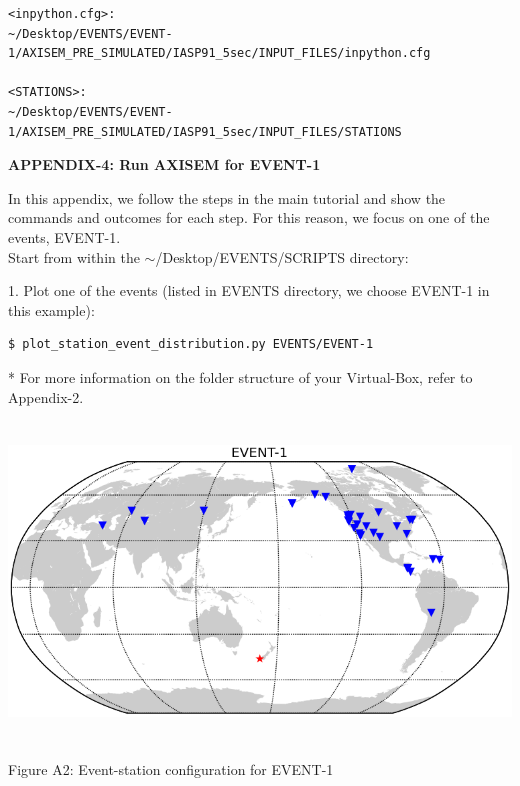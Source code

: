 \documentclass{article}
\begin{document}
\begin{lstlisting}
<inpython.cfg>: 
~/Desktop/EVENTS/EVENT-1/AXISEM_PRE_SIMULATED/IASP91_5sec/INPUT_FILES/inpython.cfg

<STATIONS>:
~/Desktop/EVENTS/EVENT-1/AXISEM_PRE_SIMULATED/IASP91_5sec/INPUT_FILES/STATIONS
\end{lstlisting}

\newpage

{\large{}\textbf{APPENDIX-4: Run AXISEM for EVENT-1}}

In this appendix, we follow the steps in the main tutorial and show the commands 
and outcomes for each step. For this reason, we focus on one of the events, EVENT-1. \\

Start from within the $\sim$/Desktop/EVENTS/SCRIPTS directory:

1. Plot one of the events (listed in EVENTS directory, we choose EVENT-1 in this example):
\begin{lstlisting}
$ plot_station_event_distribution.py EVENTS/EVENT-1
\end{lstlisting}
* For more information on the folder structure of your Virtual-Box, refer to Appendix-2.

\begin{center}
\includegraphics[width=444pt, height=240pt, keepaspectratio=true]{AXISEMTutorial-fig006.png}

{\small{}Figure A2: Event-station configuration for EVENT-1}
\end{center}
\end{document}
